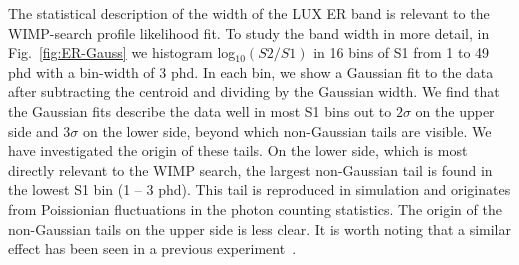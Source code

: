 The statistical description of the width of the LUX ER band is relevant to the WIMP-search profile likelihood fit. To study the band width in more detail, in Fig.~\ref{fig:ER-Gauss} we histogram log$_{10}(S2/S1)$ in 16 bins of S1 from 1 to 49 phd with a bin-width of 3 phd. In each bin, we show a Gaussian fit to the data after subtracting the centroid and dividing by the Gaussian width. We find that the Gaussian fits describe the data well  in most S1 bins out to $2\sigma$ on the upper side and $3\sigma$ on the lower side, beyond which non-Gaussian tails are visible.  We have investigated the origin of these tails. On the lower side, which is most directly relevant to the WIMP search, the largest non-Gaussian tail is found in the lowest S1 bin (1 -- 3 phd). This tail is reproduced in simulation and originates from Poissionian fluctuations in the photon counting statistics. The origin of the non-Gaussian tails on the upper side is less clear. It is worth noting that a similar effect has been seen in a previous experiment~\cite{zep3}.


